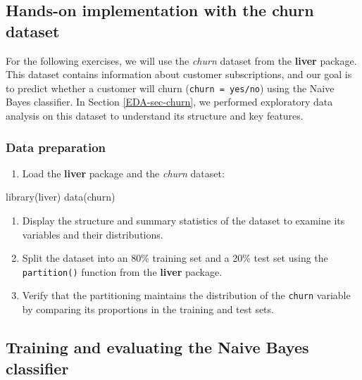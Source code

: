 \documentclass[
  11pt,
]{book}
\makeatletter
\newenvironment{Shaded}{}{}
\newcommand{\FunctionTok}[1]{#1}
\newcommand{\NormalTok}[1]{#1}
\providecommand{\tightlist}{%
  \setlength{\itemsep}{0pt}\setlength{\parskip}{0pt}}
\newenvironment{kframe}{%
\medskip{}
\setlength{\fboxsep}{.8em}
 \def\at@end@of@kframe{}%
 \ifinner\ifhmode%
  \def\at@end@of@kframe{\end{minipage}}%
  \begin{minipage}{\columnwidth}%
 \fi\fi%
 \def\FrameCommand##1{\hskip\@totalleftmargin \hskip-\fboxsep
 \colorbox{shadecolor}{##1}\hskip-\fboxsep
     \hskip-\linewidth \hskip-\@totalleftmargin \hskip\columnwidth}%
 \MakeFramed {\advance\hsize-\width
   \@totalleftmargin\z@ \linewidth\hsize
   \@setminipage}}%
 {\par\unskip\endMakeFramed%
 \at@end@of@kframe}
\renewenvironment{Shaded}{\begin{kframe}}{\end{kframe}}
\theoremstyle{definition}
\theoremstyle{definition}
\theoremstyle{definition}
\theoremstyle{definition}
\theoremstyle{remark}
\makeatother
\begin{document}
\subsection*{Hands-on implementation with the churn dataset}\label{hands-on-implementation-with-the-churn-dataset}


For the following exercises, we will use the \emph{churn} dataset from the \textbf{liver} package. This dataset contains information about customer subscriptions, and our goal is to predict whether a customer will churn (\texttt{churn\ =\ yes/no}) using the Naive Bayes classifier. In Section \ref{EDA-sec-churn}, we performed exploratory data analysis on this dataset to understand its structure and key features.

\subsubsection*{Data preparation}\label{data-preparation-2}


\begin{enumerate}
\def\labelenumi{\arabic{enumi}.}
\setcounter{enumi}{16}
\tightlist
\item
  Load the \textbf{liver} package and the \emph{churn} dataset:
\end{enumerate}

\begin{Shaded}
\begin{Highlighting}[]
\FunctionTok{library}\NormalTok{(liver)}
\FunctionTok{data}\NormalTok{(churn)}
\end{Highlighting}
\end{Shaded}

\begin{enumerate}
\def\labelenumi{\arabic{enumi}.}
\setcounter{enumi}{17}
\item
  Display the structure and summary statistics of the dataset to examine its variables and their distributions.
\item
  Split the dataset into an 80\% training set and a 20\% test set using the \texttt{partition()} function from the \textbf{liver} package.
\item
  Verify that the partitioning maintains the distribution of the \texttt{churn} variable by comparing its proportions in the training and test sets.
\end{enumerate}

\subsection*{Training and evaluating the Naive Bayes classifier}\label{training-and-evaluating-the-naive-bayes-classifier}
\end{document}
